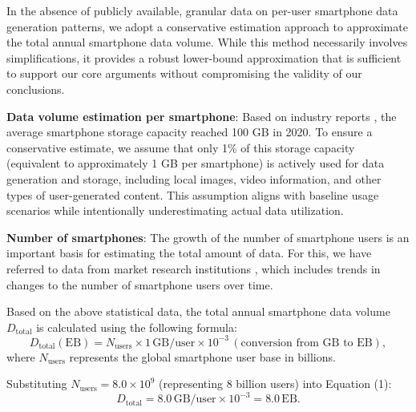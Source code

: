 In the absence of publicly available, granular data on per-user smartphone data generation patterns, we adopt a conservative estimation approach to approximate the total annual smartphone data volume. While this method necessarily involves simplifications, it provides a robust lower-bound approximation that is sufficient to support our core arguments without compromising the validity of our conclusions.

\textbf{Data volume estimation per smartphone}: Based on industry reports  \cite{counterpoint_smartphone_2021}, the average smartphone storage capacity reached 100 GB in 2020. To ensure a conservative estimate, we assume that only 1\% of this storage capacity (equivalent to approximately 1 GB per smartphone) is actively used for data generation and storage, including local images, video information, and other types of user-generated content. This assumption aligns with baseline usage scenarios while intentionally underestimating actual data utilization.

\textbf{Number of smartphones}: The growth of the number of smartphone users is an important basis for estimating the total amount of data. For this, we have referred to data from market research institutions \cite{bankmycell_smartphone_2023}, which includes trends in changes to the number of smartphone users over time.


Based on the above statistical data, the total annual smartphone data volume \( D_{\text{total}} \) is calculated using the following formula:  
\begin{equation}  
    D_{\text{total}}  (\text{EB}) = N_{\text{users}} \times 1 \, \text{GB/user} \times 10^{-3}  \, (\text{conversion from GB to EB}),
\end{equation}  
where \( N_{\text{users}} \) represents the global smartphone user base in billions.  

Substituting \( N_{\text{users}} = 8.0 \times 10^9 \) (representing 8 billion users) into Equation (1):  
\begin{equation*}  
    D_{\text{total}} = 8.0 \, \text{GB/user} \times 10^{-3} = 8.0 \, \text{EB}.
\end{equation*}  

